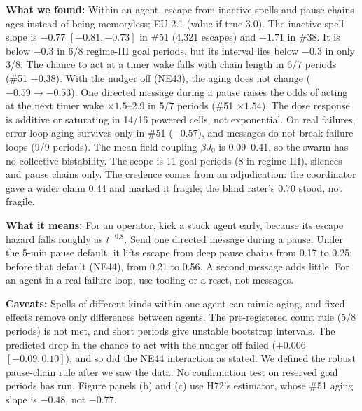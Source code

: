 \textbf{What we found:} Within an agent, escape from inactive spells and pause chains ages instead of being memoryless; EU 2.1 (value if true 3.0). The inactive-spell slope is $-0.77$ $[-0.81,-0.73]$ in \#51 (4,321 escapes) and $-1.71$ in \#38. It is below $-0.3$ in 6/8 regime-III goal periods, but its interval lies below $-0.3$ in only 3/8. The chance to act at a timer wake falls with chain length in 6/7 periods (\#51 $-0.38$). With the nudger off (NE43), the aging does not change ($-0.59\to-0.53$). One directed message during a pause raises the odds of acting at the next timer wake $\times1.5$--$2.9$ in 5/7 periods (\#51 $\times1.54$). The dose response is additive or saturating in 14/16 powered cells, not exponential. On real failures, error-loop aging survives only in \#51 ($-0.57$), and messages do not break failure loops (9/9 periods). The mean-field coupling $\beta J_0$ is 0.09--0.41, so the swarm has no collective bistability. The scope is 11 goal periods (8 in regime III), silences and pause chains only. The credence comes from an adjudication: the coordinator gave a wider claim 0.44 and marked it fragile; the blind rater's 0.70 stood, not fragile.

\textbf{What it means:} For an operator, kick a stuck agent early, because its escape hazard falls roughly as $t^{-0.8}$. Send one directed message during a pause. Under the 5-min pause default, it lifts escape from deep pause chains from 0.17 to 0.25; before that default (NE44), from 0.21 to 0.56. A second message adds little. For an agent in a real failure loop, use tooling or a reset, not messages.

\textbf{Caveats:} Spells of different kinds within one agent can mimic aging, and fixed effects remove only differences between agents. The pre-registered count rule (5/8 periods) is not met, and short periods give unstable bootstrap intervals. The predicted drop in the chance to act with the nudger off failed ($+0.006$ $[-0.09, 0.10]$), and so did the NE44 interaction as stated. We defined the robust pause-chain rule after we saw the data. No confirmation test on reserved goal periods has run. Figure panels (b) and (c) use H72's estimator, whose \#51 aging slope is $-0.48$, not $-0.77$.
